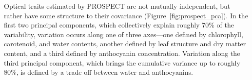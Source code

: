 Optical traits estimated by PROSPECT are not mutually independent, but rather have some structure to their covariance (Figure~\ref{fig:prospect_pca}).
In the first two principal components, which collectively explain roughly 70\% of the variability, variation occurs along one of three axes---one defined by chlorophyll, carotenoid, and water contents, another defined by leaf structure and dry matter content, and a third defined by anthocyanin concentration.
% 
% 
% 
% 
% 
% 
% 
Variation along the third principal component, which brings the cumulative variance up to roughly 80\%, is defined by a trade-off between water and anthocyanins.
% 
% 

